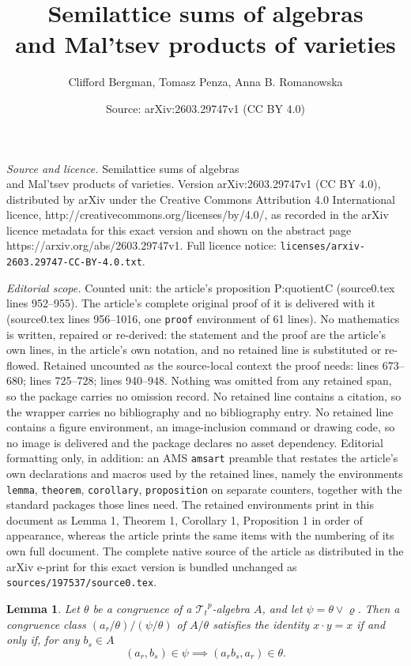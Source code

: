\documentclass[10pt,a4paper]{amsart}
\title{Semilattice sums of algebras\\ and Mal'tsev products of varieties}
\author{Clifford Bergman, Tomasz Penza, Anna B. Romanowska}
\date{Source: arXiv:2603.29747v1 (CC BY 4.0)}
\newtheorem{lemma}{Lemma}
\newcommand{\mcT}{\mathcal{T}}
\newcommand{\pro}[1]{{#1}^p}
\begin{document}
\maketitle

\noindent\emph{Source and licence.} Semilattice sums of algebras\\ and Mal'tsev products of varieties. Version arXiv:2603.29747v1 (CC BY 4.0), distributed by arXiv under the Creative Commons Attribution 4.0 International licence, http://creativecommons.org/licenses/by/4.0/, as recorded in the arXiv licence metadata for this exact version and shown on the abstract page https://arxiv.org/abs/2603.29747v1. Full licence notice: \texttt{licenses/arxiv-2603.29747-CC-BY-4.0.txt}.\par\smallskip

\noindent\textit{Editorial scope.} Counted unit: the article's proposition P:quotientC (source0.tex lines 952--955). The article's complete original proof of it is delivered with it (source0.tex lines 956--1016, one \texttt{proof} environment of 61 lines). No mathematics is written, repaired or re-derived: the statement and the proof are the article's own lines, in the article's own notation, and no retained line is substituted or re-flowed.  Retained uncounted as the source-local context the proof needs: lines 673--680; lines 725--728; lines 940--948.  Nothing was omitted from any retained span, so the package carries no omission record.  No retained line contains a citation, so the wrapper carries no bibliography and no bibliography entry.  No retained line contains a figure environment, an image-inclusion command or drawing code, so no image is delivered and the package declares no asset dependency.  Editorial formatting only, in addition: an AMS \texttt{amsart} preamble that restates the article's own declarations and macros used by the retained lines, namely the environments \texttt{lemma}, \texttt{theorem}, \texttt{corollary}, \texttt{proposition} on separate counters, together with the standard packages those lines need.  The retained environments print in this document as Lemma 1, Theorem 1, Corollary 1, Proposition 1 in order of appearance, whereas the article prints the same items with the numbering of its own full document.  The complete native source of the article as distributed in the arXiv e-print for this exact version is bundled unchanged as \texttt{sources/197537/source0.tex}.
\begin{lemma}\label{L:equivlz}
Let $\theta$ be a congruence of a $\pro{\mcT_t}$-algebra $A$, and let $\psi = \theta \vee
\varrho$. Then a congruence class $(a_r/\theta)/(\psi/\theta)$  of $A/\theta$ satisfies
the identity $x \cdot y = x$ if and only if, for any $b_s \in A$
\begin{equation}\label{E:equivlz}
(a_r, b_s) \in \psi \implies (a_r b_s, a_r) \in \theta.
\end{equation}
\end{lemma}
\end{document}
